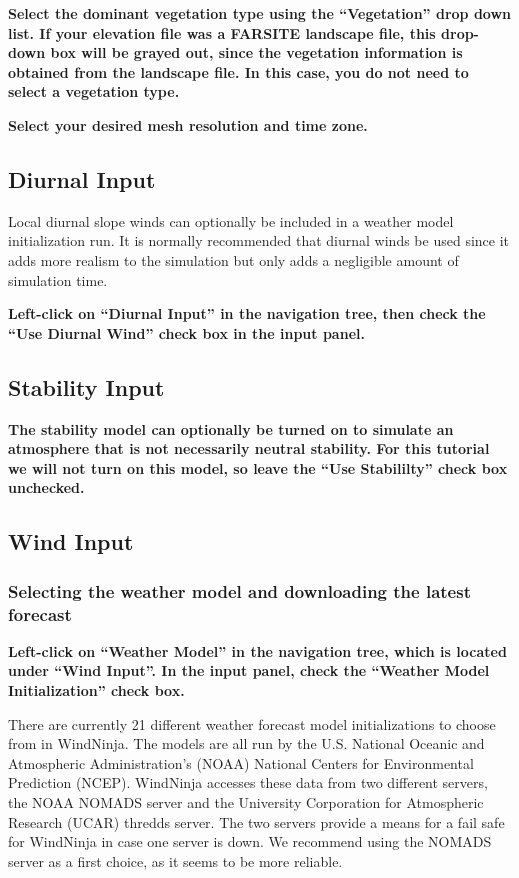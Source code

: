 \documentclass[12pt]{article}
\begin{document}
\textbf{\color{red} Select the dominant vegetation type using the “Vegetation” drop down list.  If your elevation file was a FARSITE landscape file, this drop-down box will be grayed out, since the vegetation information is obtained from the landscape file.  In this case, you do not need to select a vegetation type.}

\textbf{\color{red} Select your desired mesh resolution and time zone.}

\subsection{Diurnal Input}

Local diurnal slope winds can optionally be included in a weather model initialization run.  It is normally recommended that diurnal winds be used since it adds more realism to the simulation but only adds a negligible amount of simulation time.

\textbf{\color{red} Left-click on “Diurnal Input” in the navigation tree, then check the “Use Diurnal Wind” check box in the input panel.}

\subsection{Stability Input}

\textbf{\color{red} The stability model can optionally be turned on to simulate an atmosphere that is not necessarily neutral stability.  For this tutorial we will not turn on this model, so leave the “Use Stabililty” check box unchecked.}

\subsection{Wind Input}

\subsubsection{Selecting the weather model and downloading the latest forecast}

\textbf{\color{red} Left-click on “Weather Model” in the navigation tree, which is located under  “Wind Input”.  In the input panel, check the “Weather Model Initialization” check box.}

There are currently 21 different weather forecast model initializations to choose from in WindNinja.  The models are all run by the U.S. National Oceanic and Atmospheric Administration's (NOAA) National Centers for Environmental Prediction (NCEP).  WindNinja accesses these data from two different servers, the NOAA NOMADS server and the University Corporation for Atmospheric Research (UCAR) thredds server.  The two servers provide a means for a fail safe for WindNinja in case one server is down.  We recommend using the NOMADS server as a first choice, as it seems to be more reliable.
\end{document}
